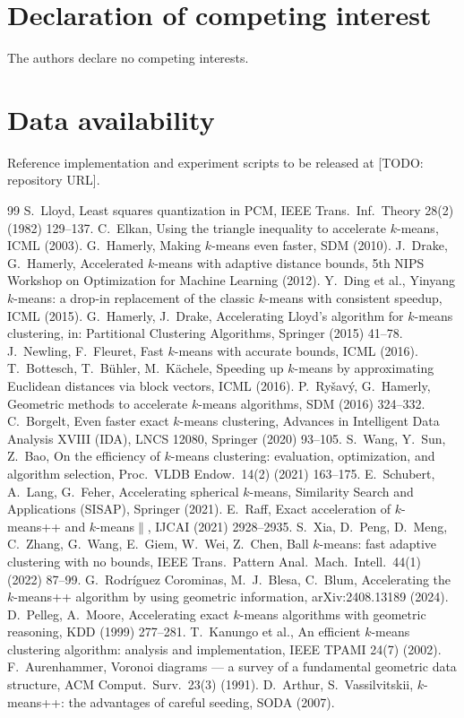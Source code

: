 \documentclass[review,12pt]{elsarticle}
\begin{document}
\section*{Declaration of competing interest}
The authors declare no competing interests.

\section*{Data availability}
Reference implementation and experiment scripts to be released at
[TODO: repository URL].

\begin{thebibliography}{99}
 S.~Lloyd, Least squares quantization in PCM, IEEE
Trans.\ Inf.\ Theory 28(2) (1982) 129--137.
 C.~Elkan, Using the triangle inequality to accelerate
$k$-means, ICML (2003).
 G.~Hamerly, Making $k$-means even faster, SDM (2010).
 J.~Drake, G.~Hamerly, Accelerated $k$-means with
adaptive distance bounds, 5th NIPS Workshop on Optimization for
Machine Learning (2012).
 Y.~Ding et al., Yinyang $k$-means: a drop-in
replacement of the classic $k$-means with consistent speedup, ICML
(2015).
 G.~Hamerly, J.~Drake, Accelerating Lloyd's
algorithm for $k$-means clustering, in: Partitional Clustering
Algorithms, Springer (2015) 41--78.
 J.~Newling, F.~Fleuret, Fast $k$-means with accurate
bounds, ICML (2016).
 T.~Bottesch, T.~B\"uhler, M.~K\"achele, Speeding up
$k$-means by approximating Euclidean distances via block vectors,
ICML (2016).
 P.~Ry\v{s}av\'{y}, G.~Hamerly, Geometric methods to
accelerate $k$-means algorithms, SDM (2016) 324--332.
 C.~Borgelt, Even faster exact $k$-means clustering,
Advances in Intelligent Data Analysis XVIII (IDA), LNCS 12080,
Springer (2020) 93--105.
 S.~Wang, Y.~Sun, Z.~Bao, On the efficiency of
$k$-means clustering: evaluation, optimization, and algorithm
selection, Proc.\ VLDB Endow.\ 14(2) (2021) 163--175.
 E.~Schubert, A.~Lang, G.~Feher, Accelerating
spherical $k$-means, Similarity Search and Applications (SISAP),
Springer (2021).
 E.~Raff, Exact acceleration of $k$-means++ and
$k$-means$\|$, IJCAI (2021) 2928--2935.
 S.~Xia, D.~Peng, D.~Meng, C.~Zhang, G.~Wang,
E.~Giem, W.~Wei, Z.~Chen, Ball $k$-means: fast adaptive clustering
with no bounds, IEEE Trans.\ Pattern Anal.\ Mach.\ Intell.\ 44(1)
(2022) 87--99.
 G.~Rodr\'iguez Corominas, M.~J.~Blesa, C.~Blum,
Accelerating the $k$-means++ algorithm by using geometric
information, arXiv:2408.13189 (2024).
 D.~Pelleg, A.~Moore, Accelerating exact $k$-means
algorithms with geometric reasoning, KDD (1999) 277--281.
 T.~Kanungo et al., An efficient $k$-means clustering
algorithm: analysis and implementation, IEEE TPAMI 24(7) (2002).
 F.~Aurenhammer, Voronoi diagrams --- a survey of
a fundamental geometric data structure, ACM Comput.\ Surv.\ 23(3)
(1991).
 D.~Arthur, S.~Vassilvitskii, $k$-means++: the
advantages of careful seeding, SODA (2007).
\end{thebibliography}
\end{document}
